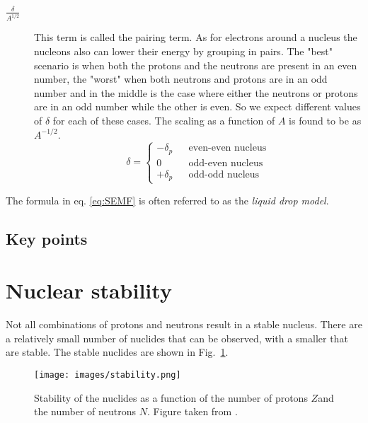 \documentclass[12pt]{article}
\begin{document}
\begin{description}
\item[$\frac{\delta}{A^{1/2}}$] This term is called the pairing term. As for electrons around a nucleus the nucleons also can lower their energy by grouping in pairs. The "best" scenario is when both the protons and the neutrons are present in an even number, the "worst" when both neutrons and protons are in an odd number and in the middle is the case where either the neutrons or protons are in an odd number while the other is even. So we expect different values of $\delta$ for each of these cases. The scaling as a function of $A$ is found to be as $A^{-1/2}$.     
\[\delta=\left\{\begin{array}{ccc}
-\delta_p& &\mbox{even-even nucleus}\\
0& &\mbox{odd-even nucleus}\\
+\delta_p& &\mbox{odd-odd nucleus}
\end{array}\right.\]
\end{description}

The formula in eq. \ref{eq:SEMF} is often referred to as the \emph{liquid drop model}. 
\subsection{Key points}\begin{itemize}
  
\end{itemize}
\section{Nuclear stability} 
Not all combinations of protons and neutrons result in a stable nucleus. There are a relatively small number of nuclides that can be observed, with a smaller that are stable. The stable nuclides are shown in Fig.~\ref{fig:stability}. 
\begin{figure}
\begin{center}
 \texttt{[image: images/stability.png]}
\end{center}
 \caption{Stability of the nuclides as a function of the number of protons $Z$and the number of neutrons $N$. Figure taken from \cite{nndc}.}\label{fig:stability}
\end{figure}
\end{document}
